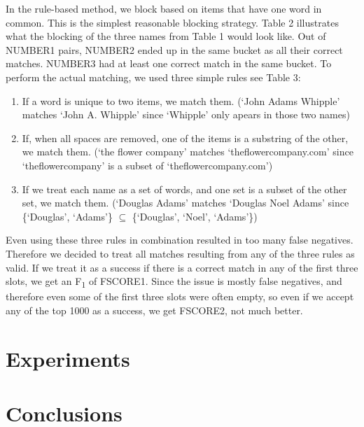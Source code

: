 \documentclass{vldb}
\begin{document}
In the rule-based method, we block based on items that have one word in common. This is the simplest reasonable blocking strategy. Table 2 illustrates what the blocking of the three names from Table 1 would look like. Out of NUMBER1 pairs, NUMBER2 ended up in the same bucket as all their correct matches. NUMBER3 had at least one correct match in the same bucket. To perform the actual matching, we used three simple rules see Table 3:
\begin{enumerate}

\item If a word is unique to two items, we match them. (`John Adams Whipple' matches `John A. Whipple' since `Whipple' only apears in those two names)
\item If, when all spaces are removed, one of the items is a substring of the other, we match them. (`the flower company' matches `theflowercompany.com' since `theflowercompany' is a subset of `theflowercompany.com')
\item If we treat each name as a set of words, and one set is a subset of the other set, we match them. (`Douglas Adams' matches `Douglas Noel Adams' since \{`Douglas', `Adams'\} $\subseteq$ \{`Douglas', `Noel', `Adams'\})

\end{enumerate} 
Even using these three rules in combination resulted in too many false negatives. Therefore we decided to treat all matches resulting from any of the three rules as valid. If we treat it as a success if there is a correct match in any of the first three slots, we get an F\textsubscript{1} of FSCORE1. Since the issue is mostly false negatives, and therefore even some of the first three slots were often empty, so even if we accept any of the top 1000 as a success, we get FSCORE2, not much better.



\section{Experiments}

\section{Conclusions}

\balance

\end{document}
